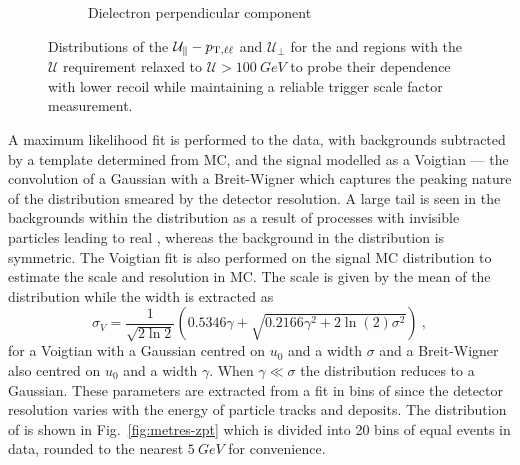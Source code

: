 \begin{figure}[htb]
\begin{subfigure}[b]{0.49\textwidth}
        \caption{Dielectron perpendicular component}
        \label{subfigd:recoil-calib-dists}
    \end{subfigure}
    \caption[Recoil distributions in dilepton final states.]{
        Distributions of the $\mathcal{U}_{\parallel}-p_{\mathrm{T},\ell\ell}$ and $\mathcal{U}_{\perp}$ for the \dimuplusjets and \dieleplusjets regions with the $\mathcal{U}$ requirement relaxed to ${\mathcal{U}>\SI{100}{GeV}}$ to probe their dependence with lower recoil while maintaining a reliable \ptmiss trigger scale factor measurement.
    }
    \label{fig:recoil-calib-dists}
\end{figure}

A maximum likelihood fit is performed to the data, with backgrounds subtracted by a template determined from MC, and the signal modelled as a Voigtian --- the convolution of a Gaussian with a Breit-Wigner which captures the peaking nature of the distribution smeared by the detector resolution. A large tail is seen in the backgrounds within the \recoilpara distribution as a result of processes with invisible particles leading to real \ptmiss, whereas the background in the \recoilperp distribution is symmetric. The Voigtian fit is also performed on the signal MC distribution to estimate the scale and resolution in MC. The scale is given by the mean of the distribution while the width is extracted as
%
\begin{equation}
    \sigma_V = \frac{1}{\sqrt{2\ln 2}}\left(0.5346\gamma + \sqrt{0.2166\gamma^2 + 2\ln(2) \sigma^2}\right)\ ,
\end{equation}
%
for a Voigtian with a Gaussian centred on $u_0$ and a width $\sigma$ and a Breit-Wigner also centred on $u_0$ and a width $\gamma$. When $\gamma\ll\sigma$ the distribution reduces to a Gaussian. These parameters are extracted from a fit in bins of \ptll since the detector resolution varies with the energy of particle tracks and deposits. The distribution of \ptll is shown in Fig.~\ref{fig:metres-zpt} which is divided into 20 bins of equal events in data, rounded to the nearest ${\SI{5}{GeV}}$ for convenience.
%
